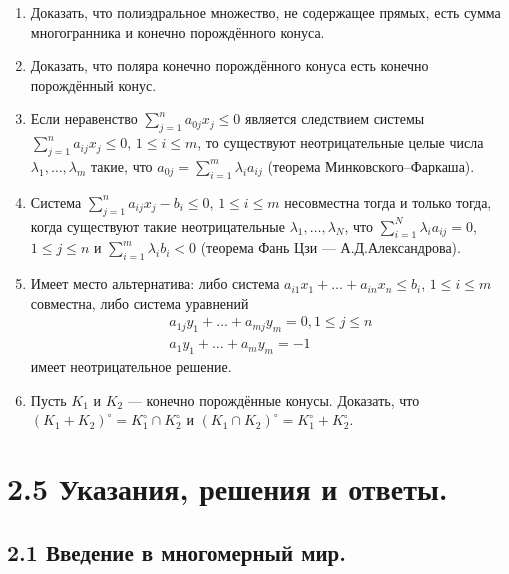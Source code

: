 	\begin{enumerate}[resume*]

		\item Доказать, что полиэдральное множество, не содержащее прямых, есть сумма многогранника и конечно порождённого конуса.

		\item Доказать, что поляра конечно порождённого конуса есть конечно порождённый конус.

		\item Если неравенство $\sum\limits_{j=1}^n a_{0j} x_j \le 0$ является следствием системы $\sum\limits_{j=1}^n a_{ij} x_j \le 0$, $1 \le i \le m$, то существуют неотрицательные целые числа $\lambda_1,\dots,\lambda_m$ такие, что $a_{0j} = \sum\limits_{i=1}^m \lambda_i a_{ij}$ (теорема Минковского–Фаркаша).

		\item Система $\sum\limits_{j=1}^n a_{ij} x_j - b_i \le 0$, $1 \le i \le m$ несовместна тогда и только тогда, когда существуют такие неотрицательные $\lambda_1,\dots,\lambda_N$, что $\sum\limits_{i=1}^N \lambda_i a_{ij} = 0$, $1 \le j \le n$ и $\sum\limits_{i=1}^m \lambda_i b_i < 0$ (теорема Фань Цзи — А.Д.Александрова).

		\item Имеет место альтернатива:  
		либо система $a_{i1}x_1 + \dots + a_{in}x_n \le b_i$, $1 \le i \le m$ совместна,  
		либо система уравнений  
		\begin{gather*}
			a_{1j}y_1 + \dots + a_{mj}y_m = 0, 1 \le j \le n \\ 
			a_{1}y_1 + \dots + a_{m}y_m = -1  
		\end{gather*}
		имеет неотрицательное решение.

		\item Пусть $K_1$ и $K_2$ — конечно порождённые конусы. Доказать, что  
			$(K_1 + K_2)^{\circ} = K_1^\circ \cap K_2^\circ$ и $(K_1 \cap K_2)^\circ = K_1^\circ + K_2^\circ$.

	\end{enumerate}

	\section{2.5 Указания, решения и ответы.}

	\subsection{2.1 Введение в многомерный мир.}

